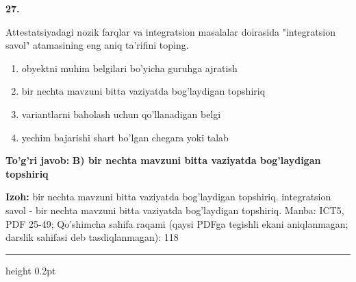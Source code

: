 \documentclass[10pt,a4paper]{article}
\begin{document}
{\bfseries\sffamily\color{ink} 27.}
\par
Attestatsiyadagi nozik farqlar va integratsion masalalar doirasida "integratsion savol" atamasining eng aniq ta'rifini toping.
\begin{enumerate}[label=\Alph*),leftmargin=9mm]
\item obyektni muhim belgilari bo'yicha guruhga ajratish
\item bir nechta mavzuni bitta vaziyatda bog'laydigan topshiriq
\item variantlarni baholash uchun qo'llanadigan belgi
\item yechim bajarishi shart bo'lgan chegara yoki talab
\end{enumerate}
\begin{tcolorbox}[enhanced,breakable,colback=teal!4,colframe=teal!60!black,boxrule=0.45pt,arc=1.2mm,left=2.7mm,right=2.7mm,top=1.8mm,bottom=1.8mm,before skip=2mm,after skip=2mm]
{\bfseries\sffamily\color{teal}To'g'ri javob:} \textbf{B) bir nechta mavzuni bitta vaziyatda bog'laydigan topshiriq}
\par\smallskip
{\bfseries Izoh:} bir nechta mavzuni bitta vaziyatda bog'laydigan topshiriq. integratsion savol - bir nechta mavzuni bitta vaziyatda bog'laydigan topshiriq. Manba: ICT5, PDF 25-49; Qo'shimcha sahifa raqami (qaysi PDFga tegishli ekani aniqlanmagan; darslik sahifasi deb tasdiqlanmagan): 118
\end{tcolorbox}
\vspace{2mm}\hrule height 0.2pt\vspace{3mm}
\end{document}
